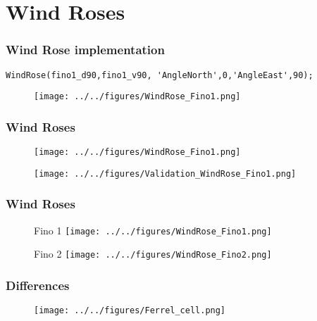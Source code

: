 \documentclass[12pt,t]{beamer}
\begin{document}
\section{Wind Roses}
\begin{frame}[fragile]
\frametitle{Wind Rose implementation}
\begin{lstlisting}
WindRose(fino1_d90,fino1_v90, 'AngleNorth',0,'AngleEast',90);
\end{lstlisting}
\begin{figure}
\centering
\texttt{[image: ../../figures/WindRose\_Fino1.png]}
\end{figure}

\end{frame}
\begin{frame}
	\frametitle{Wind Roses}
\begin{figure}[htbp]
	\begin{center}
		\begin{minipage}[t]{0.4\linewidth}
			\centering
			\texttt{[image: ../../figures/WindRose\_Fino1.png]}

			\label{label 1}
		\end{minipage}
		\qquad
		\pause
		\begin{minipage}[t]{0.5\linewidth}
			\centering
			\texttt{[image: ../../figures/Validation\_WindRose\_Fino1.png]}
			\label{label 2}
		\end{minipage}
	\end{center}
\end{figure}
\end{frame}

\begin{frame}
	\frametitle{Wind Roses}
\begin{figure}[htbp]
	\begin{center}
		\begin{minipage}[t]{0.45\linewidth}
			\centering
			Fino 1
			\texttt{[image: ../../figures/WindRose\_Fino1.png]}
			\label{label 1}
		\end{minipage}
		\begin{minipage}[t]{0.45\linewidth}
			\centering
			Fino 2
			\texttt{[image: ../../figures/WindRose\_Fino2.png]}
			\label{label 2}
		\end{minipage}
	\end{center}
\end{figure}
\end{frame}
\begin{frame}
\frametitle{Differences}
\begin{figure}[H]
\centering
\texttt{[image: ../../figures/Ferrel\_cell.png]}
\label{fig:weatherpattern}
\end{figure}
\end{frame}
\end{document}
